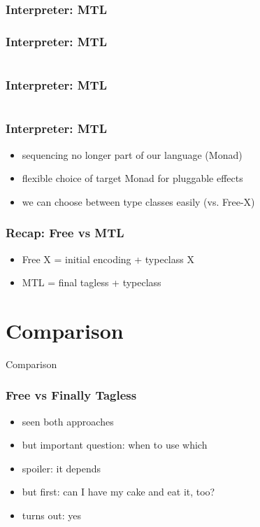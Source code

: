 \documentclass[aspectratio=169, hyperref={colorlinks, linkcolor=beamer@centricgreen}, urlcolor=links]{beamer}
\begin{document}
\begin{frame}
  \frametitle{Interpreter: MTL}
\end{frame}

\begin{frame}
  \frametitle{Interpreter: MTL}
  \inputminted[fontsize=\footnotesize]{scala}{snippets/final-mtl-sample.scala}
\end{frame}

\begin{frame}
  \frametitle{Interpreter: MTL}
  \inputminted[fontsize=\footnotesize]{scala}{snippets/final-mtl-interp.scala}
\end{frame}

\begin{frame}
  \frametitle{Interpreter: MTL}
  \begin{itemize}
  \item sequencing no longer part of our language (Monad)
  \item flexible choice of target Monad for pluggable effects
  \item we can choose between type classes easily (vs. Free-X)
  \end{itemize}
\end{frame}

\begin{frame}
  \frametitle{Recap: Free vs MTL}
  \begin{itemize}
  \item Free X = initial encoding + typeclass X
  \item MTL = final tagless + typeclass
  \end{itemize}
\end{frame}

\section{Comparison}\label{sec:comparison}

\begin{frame}
  \begin{center}
    \Huge
    Comparison
  \end{center}
\end{frame}

\begin{frame}
  \frametitle{Free vs Finally Tagless}
  \begin{itemize}
  \item seen both approaches
  \item but important question: when to use which
  \item spoiler: it depends
  \item but first: can I have my cake and eat it, too?
  \item turns out: yes
  \end{itemize}
\end{frame}
\end{document}
